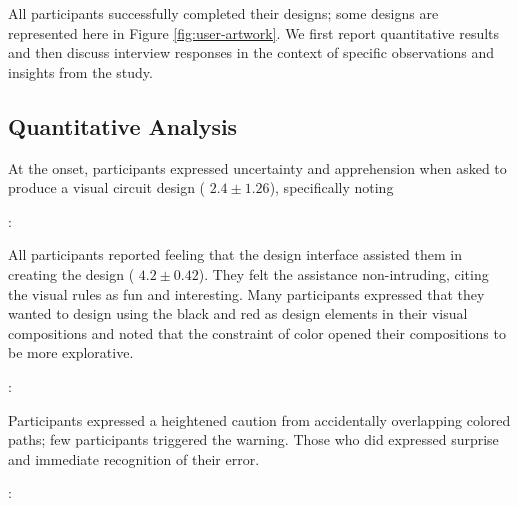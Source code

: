 \documentclass{sigchi}
\begin{document}
All participants successfully completed their designs; some designs are represented here in Figure \ref{fig:user-artwork}. 
We first report quantitative results and then discuss interview responses in the context of specific observations and insights from the study.

\subsection{Quantitative Analysis}
  At the onset, participants expressed uncertainty and apprehension when asked to produce a visual circuit design ( $2.4 \pm 1.26$), specifically noting 
  \begin{myquote}
   \vspace{-2pt}
    :
    \vspace{-2pt}
  \end{myquote}
  All participants reported feeling that the design interface assisted them in creating the design ( $4.2 \pm 0.42$). They felt the assistance non-intruding, citing the visual rules as fun and interesting. Many participants expressed that they wanted to design using the black and red as design elements in their visual compositions and noted that the constraint of color opened their compositions to be more explorative. 
    \begin{myquote}
   \vspace{-2pt}
    :
    \vspace{-2pt}
  \end{myquote}
  Participants expressed a heightened caution from accidentally overlapping colored paths; few participants triggered the warning. Those who did expressed surprise and immediate recognition of their error. 
  \begin{myquote}
   \vspace{-2pt}
    :
    \vspace{-2pt}
  \end{myquote}
\end{document}
